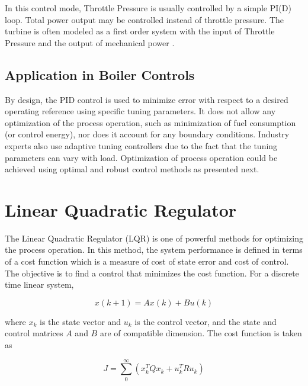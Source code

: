         
        In this control mode, Throttle Pressure is usually controlled by a simple PI(D) loop. Total power output may be controlled instead of throttle pressure. The turbine is often modeled as a first order system with the input of Throttle Pressure and the output of mechanical power \cite{controlguruWebsite}.

        \subsection{Application in Boiler Controls}

        By design, the PID control is used to minimize error with respect to a desired operating reference using specific tuning parameters. It does not allow any optimization of the process operation, such as minimization of fuel consumption (or control energy), nor does it account for any boundary conditions. Industry experts also use adaptive tuning controllers due to the fact that the tuning parameters can vary with load. Optimization of process operation could be achieved using optimal  and robust control methods as presented next.

    \section{Linear Quadratic Regulator}
    
        The Linear Quadratic Regulator (LQR) is one of powerful methods for optimizing the process operation.  In this method, the system performance is defined in terms of a cost function which is a measure of cost of state error and cost of control.  The objective is to find a control that minimizes the cost function.  For a discrete time linear system,
        
        \begin{equation} 
            \label{eq:lqr1}
            x(k+1) = A x(k) + B u(k)
        \end{equation}
        
        where $x_k$ is the state vector and $u_k$ is the control vector, and the state and control matrices $A$ and $B$ are of compatible dimension.  The cost function is taken as
        
        \begin{equation}
            \label{eq:lqr2}
            J = \sum_{0}^{\infty} \left ( x_k^T Q x_k + u_k^T R u_k\right )
        \end{equation}
        
